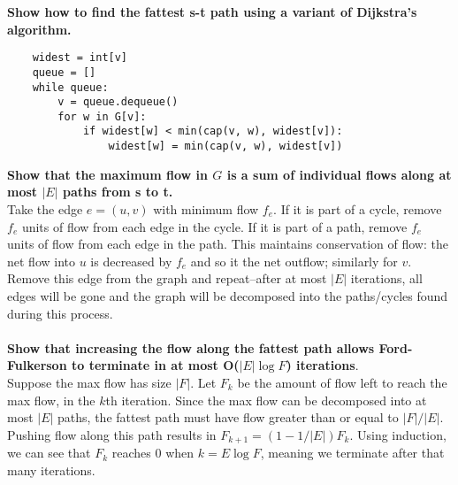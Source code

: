 \newpage
\begin{problem}{7.31}
\textbf{Show how to find the fattest s-t path using a variant of Dijkstra's algorithm.}
\begin{lstlisting}
    widest = int[v]
    queue = []
    while queue:
        v = queue.dequeue()
        for w in G[v]:
            if widest[w] < min(cap(v, w), widest[v]):
                widest[w] = min(cap(v, w), widest[v])
\end{lstlisting}

\textbf{Show that the maximum flow in $G$ is a sum of individual flows along at most $|E|$ paths from s to t.} \\
Take the edge $e = (u, v)$ with minimum flow $f_e$. If it is part of a cycle, remove $f_e$ units of flow from each edge in the cycle. If it is part of a path, remove $f_e$ units of flow from each edge in the path. This maintains conservation of flow: the net flow into $u$ is decreased by $f_e$ and so it the net outflow; similarly for $v$. Remove this edge from the graph and repeat--after at most $|E|$ iterations, all edges will be gone and the graph will be decomposed into the paths/cycles found during this process. \\ \\

\textbf{Show that increasing the flow along the fattest path allows Ford-Fulkerson to terminate in at most O($|E| \log F$) iterations}. \\
Suppose the max flow has size $|F|$. Let $F_k$ be the amount of flow left to reach the max flow, in the $k$th iteration. Since the max flow can be decomposed into at most $|E|$ paths, the fattest path must have flow greater than or equal to $|F| / |E|$. Pushing flow along this path results in $F_{k + 1} = (1 - 1 / |E|)F_k$. Using induction, we can see that $F_{k}$ reaches 0 when $k = E \log F$, meaning we terminate after that many iterations.
\end{problem}
